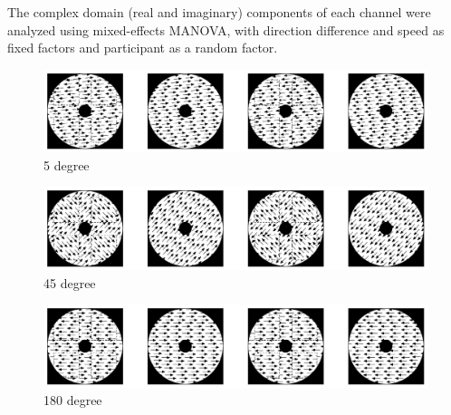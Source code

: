 \documentclass[landscape,final,paperwidth=72in,paperheight=42in,fontscale=0.285]{baposter}
\begin{document}
\begin{poster}
{      The complex domain (real and imaginary) components of each channel were analyzed using mixed-effects MANOVA, with direction difference and speed as fixed factors and participant as a random factor.  
      }
    {
      \vspace{2em}
\begin{figure}[H]
  \centering
  \caption{5 degree}\label{mofo-child-tuning-dir5.jpg}
  \includegraphics[scale=0.3]{img/mofo-child-tuning-dir5.jpg}
\end{figure}
\begin{figure}[H]
  \centering
  \caption{45 degree}\label{mofo-child-tuning-dir45.jpg}
  \includegraphics[scale=0.3]{img/mofo-child-tuning-dir45.jpg}
\end{figure}
\begin{figure}[H]
  \centering
  \caption{180 degree}\label{mofo-child-tuning-dir180.jpg}
  \includegraphics[scale=0.3]{img/mofo-child-tuning-dir180.jpg}
\end{figure}      
      \vspace{2em}
    }
    {

}
\end{poster}
\end{document}
